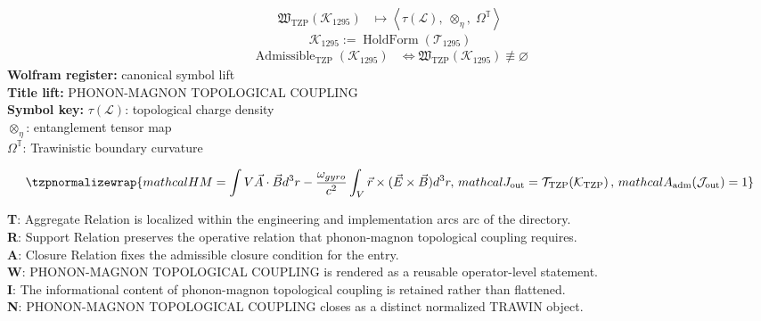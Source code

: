 \noindent
\begin{minipage}[t]{0.48\linewidth}
\begingroup
\small
\[
\begin{aligned}
\mathfrak{W}_{\mathrm{TZP}}\!\left(\mathcal{K}_{1295}\right)
&\longmapsto
\left\langle \tau(\mathcal{L}),\; \otimes_{\eta},\; \Omega^{\mathbb{T}} \right\rangle
\end{aligned}
\]
\[
\mathcal{K}_{1295}
:=
\operatorname{HoldForm}\!\left(\mathcal{T}_{1295}\right)
\]
\[
\begin{aligned}
\operatorname{Admissible}_{\mathrm{TZP}}\!\left(\mathcal{K}_{1295}\right)
&\Longleftrightarrow
\mathfrak{W}_{\mathrm{TZP}}\!\left(\mathcal{K}_{1295}\right)\not\equiv\varnothing
\end{aligned}
\]
\textbf{Wolfram register:} canonical symbol lift\\
\textbf{Title lift:} PHONON-MAGNON TOPOLOGICAL COUPLING\\
\textbf{Symbol key:} \(\tau(\mathcal{L})\): topological charge density\\ \(\otimes_{\eta}\): entanglement tensor map\\ \(\Omega^{\mathbb{T}}\): Trawinistic boundary curvature
\par
\endgroup
\end{minipage}\hfill
\begin{minipage}[t]{0.48\linewidth}
\[
\tzpnormalizewrap{mathcal{H} {M} = \int {V}\vec{A}\cdot\vec{B}d^{3}r - \frac{\omega_{gyro}}{c^{2}}\int_{V}\vec{r}\times(\vec{E}\times\vec{B})d^{3}r,\,mathcal{J}_{\mathrm{out}} = \mathcal{T}_{\mathrm{TZP}}\!\left(\mathcal{K}_{\mathrm{TZP}}\right),\,mathcal{A}_{\mathrm{adm}}\!\left(\mathcal{J}_{\mathrm{out}}\right)=1}
\]

\small
\textbf{T}: Aggregate Relation is localized within the engineering and implementation arcs arc of the directory.\\
\textbf{R}: Support Relation preserves the operative relation that phonon-magnon topological coupling requires.\\
\textbf{A}: Closure Relation fixes the admissible closure condition for the entry.\\
\textbf{W}: PHONON-MAGNON TOPOLOGICAL COUPLING is rendered as a reusable operator-level statement.\\
\textbf{I}: The informational content of phonon-magnon topological coupling is retained rather than flattened.\\
\textbf{N}: PHONON-MAGNON TOPOLOGICAL COUPLING closes as a distinct normalized TRAWIN object.
\normalsize
\end{minipage}

